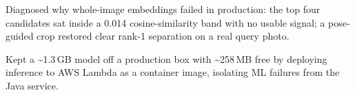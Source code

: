 \documentclass[letterpaper,10pt]{article}
\newcommand{\nk}{\kern0pt}
\newcommand{\resumeItem}[1]{
  \item\small{
    {#1 \vspace{-3pt}}
  }
}
\begin{document}
        \resumeItem{Diagnosed why whole-image embeddings failed in production: the top four candidates sat inside a 0.014 cosine-similarity band with no usable signal; a pose-guided crop restored clear rank-1 separation on a real query photo.}
        \resumeItem{Kept a \textasciitilde1.3\,GB model off a production box with \textasciitilde258\,MB free by deploying inference to A\nk WS Lambda as a container image, isolating ML failures from the Java service.}
\end{document}

